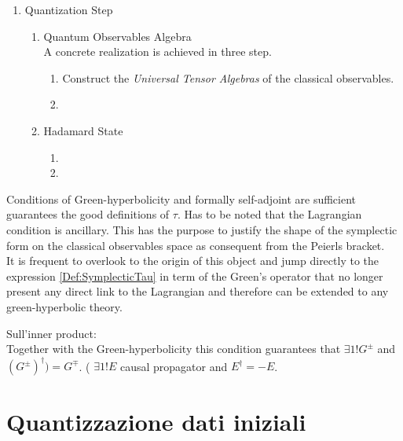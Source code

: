 \documentclass[Main]{subfiles}
\begin{document}
\begin{enumerate}
   		\item Quantization Step
   		   	\begin{enumerate}
   				\item Quantum Observables Algebra\\
   					A concrete realization is achieved in three step.
   					\begin{enumerate}
   						\item Construct the \emph{Universal Tensor Algebras} of the classical observables.
   						\item
   					\end{enumerate}
   					
   				\item Hadamard State
   				   	\begin{enumerate}
   						\item
   						\item
   					\end{enumerate}
   				 
   			\end{enumerate}
 	\end{enumerate}
 	
	\begin{observation}
		Conditions of Green-hyperbolicity and formally self-adjoint are sufficient guarantees the good definitions of $\tau$.
		Has to be noted that the Lagrangian condition is ancillary. This has the purpose to justify the shape of the symplectic form on the classical observables space as consequent from the Peierls bracket.
		\\
	It is frequent\cite{Dewitt1999}\cite{Benini} to overlook to the origin of this object and jump directly to the expression \ref{Def:SymplecticTau}  in term of the Green's operator that no longer present any direct link to the Lagrangian and therefore can be extended to any green-hyperbolic theory.
	\end{observation}
	
	\begin{Warning}
		Sull'inner product:\\
						Together with the Green-hyperbolicity this condition guarantees that $\exists 1! G^\pm$ and $(G^\pm)^\dagger) = G^\mp$.
				( $\exists 1! E$ causal propagator and $E^\dagger =  -E$.
	\end{Warning}
 	
 	\section{Quantizzazione dati iniziali}
\end{document}
